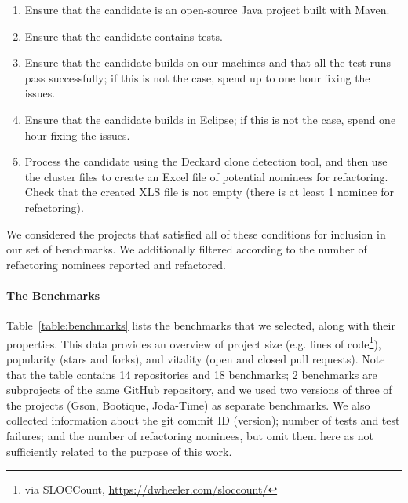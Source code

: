 \begin{enumerate}
  \item Ensure that the candidate is an open-source Java project built with Maven.
  \item Ensure that the candidate contains tests.
  \item Ensure that the candidate builds on our machines and that all the test runs pass successfully; if this is not the case, spend up to one hour fixing the issues.
  \item Ensure that the candidate builds in Eclipse; if this is not the case, spend one hour fixing the issues.
  \item Process the candidate using the Deckard clone detection tool, and then use the cluster files to create an Excel file of potential nominees for refactoring. Check that the created XLS file is not empty (there is at least 1 nominee for refactoring).
\end{enumerate}

We considered the projects that satisfied all of these conditions for inclusion in our set of benchmarks. We additionally filtered according to the number of refactoring nominees reported and refactored.

\paragraph{The Benchmarks}
Table~\ref{table:benchmarks} lists the benchmarks that we selected,
along with their properties. This data provides an overview of project
size (e.g. lines of code\footnote{via SLOCCount, \url{https://dwheeler.com/sloccount/}}), popularity (stars and forks), and vitality (open and
closed pull requests). Note that the table contains 14 repositories and 18 benchmarks; 2 benchmarks are subprojects of the same GitHub repository, and we used two versions of three of the projects (Gson, Bootique, Joda-Time) as separate benchmarks.
We also collected information about the git commit ID (version); number of tests and test failures; and the number of refactoring nominees, but omit them here as not sufficiently related to the purpose of this work.

